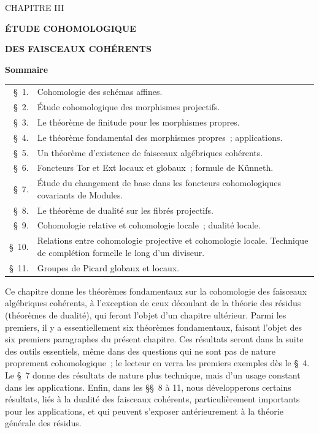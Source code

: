 \begin{center}
{\large CHAPITRE III\par}
\vspace{1.5em}
{\Large\bfseries ÉTUDE COHOMOLOGIQUE\par}
{\Large\bfseries DES FAISCEAUX COHÉRENTS\par}
\vspace{1.8em}
{\bfseries Sommaire\par}
\end{center}

\medskip
\begin{tabular}{@{}r@{\ }p{}@{}}
\S~1. & Cohomologie des schémas affines.\\
\S~2. & Étude cohomologique des morphismes projectifs.\\
\S~3. & Le théorème de finitude pour les morphismes propres.\\
\S~4. & Le théorème fondamental des morphismes propres~; applications.\\
\S~5. & Un théorème d'existence de faisceaux algébriques cohérents.\\
\S~6. & Foncteurs Tor et Ext locaux et globaux~; formule de Künneth.\\
\S~7. & Étude du changement de base dans les foncteurs cohomologiques
covariants de Modules.\\
\S~8. & Le théorème de dualité sur les fibrés projectifs.\\
\S~9. & Cohomologie relative et cohomologie locale~; dualité locale.\\
\S~10. & Relations entre cohomologie projective et cohomologie locale.
Technique de complétion formelle le long d'un diviseur.\\
\S~11. & Groupes de Picard globaux et locaux\footnotemark.
\end{tabular}

\medskip
Ce chapitre donne les théorèmes fondamentaux sur la cohomologie des faisceaux
algébriques cohérents, à l'exception de ceux découlant de la théorie des
résidus (théorèmes de dualité), qui feront l'objet d'un chapitre ultérieur.
Parmi les premiers, il y a essentiellement six théorèmes fondamentaux,
faisant l'objet des six premiers paragraphes du présent chapitre. Ces
résultats seront dans la suite des outils essentiels, même dans des questions
qui ne sont pas de nature proprement cohomologique~; le lecteur en verra les
premiers exemples dès le \S~4. Le \S~7 donne des résultats de nature plus
technique, mais d'un usage constant dans les applications. Enfin, dans les
\S\S~8 à 11, nous développerons certains résultats, liés à la dualité des
faisceaux cohérents, particulièrement importants pour les applications, et
qui peuvent s'exposer antérieurement à la théorie générale des résidus.

